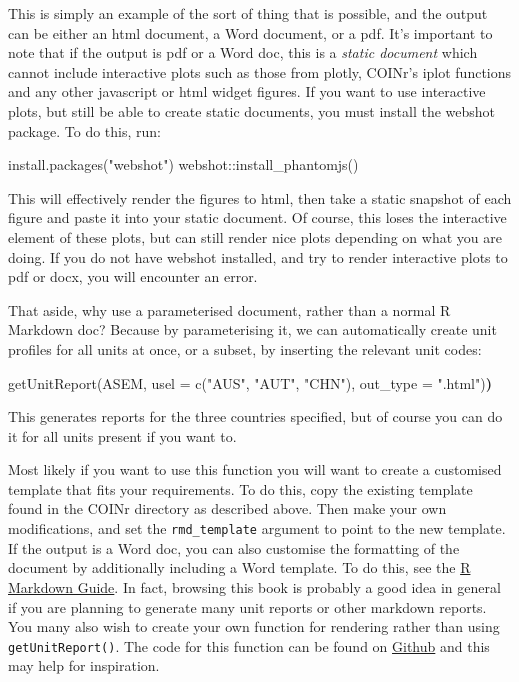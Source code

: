 \documentclass[
]{book}
\newenvironment{Shaded}{\begin{snugshade}}{\end{snugshade}}
\newcommand{\AttributeTok}[1]{\textcolor[rgb]{0.77,0.63,0.00}{#1}}
\newcommand{\ErrorTok}[1]{\textcolor[rgb]{0.64,0.00,0.00}{\textbf{#1}}}
\newcommand{\FunctionTok}[1]{\textcolor[rgb]{0.00,0.00,0.00}{#1}}
\newcommand{\NormalTok}[1]{#1}
\newcommand{\SpecialCharTok}[1]{\textcolor[rgb]{0.00,0.00,0.00}{#1}}
\newcommand{\StringTok}[1]{\textcolor[rgb]{0.31,0.60,0.02}{#1}}
\begin{document}
This is simply an example of the sort of thing that is possible, and the output can be either an html document, a Word document, or a pdf. It's important to note that if the output is pdf or a Word doc, this is a \emph{static document} which cannot include interactive plots such as those from plotly, COINr's iplot functions and any other javascript or html widget figures. If you want to use interactive plots, but still be able to create static documents, you must install the webshot package. To do this, run:

\begin{Shaded}
\begin{Highlighting}[]
\FunctionTok{install.packages}\NormalTok{(}\StringTok{"webshot"}\NormalTok{)}
\NormalTok{webshot}\SpecialCharTok{::}\FunctionTok{install\_phantomjs}\NormalTok{()}
\end{Highlighting}
\end{Shaded}

This will effectively render the figures to html, then take a static snapshot of each figure and paste it into your static document. Of course, this loses the interactive element of these plots, but can still render nice plots depending on what you are doing. If you do not have webshot installed, and try to render interactive plots to pdf or docx, you will encounter an error.

That aside, why use a parameterised document, rather than a normal R Markdown doc? Because by parameterising it, we can automatically create unit profiles for all units at once, or a subset, by inserting the relevant unit codes:

\begin{Shaded}
\begin{Highlighting}[]
\FunctionTok{getUnitReport}\NormalTok{(ASEM, }\AttributeTok{usel =} \FunctionTok{c}\NormalTok{(}\StringTok{"AUS"}\NormalTok{, }\StringTok{"AUT"}\NormalTok{, }\StringTok{"CHN"}\NormalTok{), }\AttributeTok{out\_type =} \StringTok{".html"}\NormalTok{)}\ErrorTok{)}
\end{Highlighting}
\end{Shaded}

This generates reports for the three countries specified, but of course you can do it for all units present if you want to.

Most likely if you want to use this function you will want to create a customised template that fits your requirements. To do this, copy the existing template found in the COINr directory as described above. Then make your own modifications, and set the \texttt{rmd\_template} argument to point to the new template. If the output is a Word doc, you can also customise the formatting of the document by additionally including a Word template. To do this, see the \href{https://bookdown.org/yihui/rmarkdown/word-document.html}{R Markdown Guide}. In fact, browsing this book is probably a good idea in general if you are planning to generate many unit reports or other markdown reports. You many also wish to create your own function for rendering rather than using \texttt{getUnitReport()}. The code for this function can be found on \href{https://github.com/bluefoxr/COINr/blob/master/R/coin_resultstable.R}{Github} and this may help for inspiration.
\end{document}
